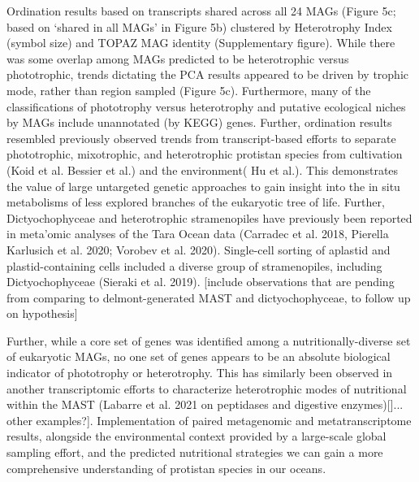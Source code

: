 \documentclass[12pt]{article}
\numberwithin{equation}{section}
\begin{document}
Ordination results based on transcripts shared across all 24 MAGs (Figure 5c; based on ‘shared in all MAGs’ in Figure 5b) clustered by Heterotrophy Index (symbol size) and TOPAZ MAG identity (Supplementary figure). While there was some overlap among MAGs predicted to be heterotrophic versus phototrophic, trends dictating the PCA results appeared to be driven by trophic mode, rather than region sampled (Figure 5c). Furthermore, many of the classifications of phototrophy versus heterotrophy and putative ecological niches by MAGs include unannotated (by KEGG) genes. Further, ordination results resembled previously observed trends from transcript-based efforts to separate phototrophic, mixotrophic, and heterotrophic protistan species from cultivation (Koid et al. Bessier et al.) and the environment( Hu et al.). This demonstrates the value of large untargeted genetic approaches to gain insight into the in situ metabolisms of less explored branches of the eukaryotic tree of life. Further, Dictyochophyceae and heterotrophic stramenopiles have previously been reported in meta’omic analyses of the Tara Ocean data (Carradec et al. 2018, Pierella Karlusich et al. 2020; Vorobev et al. 2020). Single-cell sorting of aplastid and plastid-containing cells included a diverse group of stramenopiles, including Dictyochophyceae (Sieraki et al. 2019). [include observations that are pending from comparing to delmont-generated MAST and dictyochophyceae, to follow up on hypothesis]

Further, while a core set of genes was identified among a nutritionally-diverse set of eukaryotic MAGs, no one set of genes appears to be an absolute biological indicator of phototrophy or heterotrophy. This has similarly been observed in another transcriptomic efforts to characterize heterotrophic modes of nutritional within the MAST (Labarre et al. 2021 on peptidases and digestive enzymes)[]... other examples?]. Implementation of paired metagenomic and metatranscriptome results, alongside the environmental context provided by a large-scale global sampling effort, and the predicted nutritional strategies we can gain a more comprehensive understanding of protistan species in our oceans.


\end{document}
